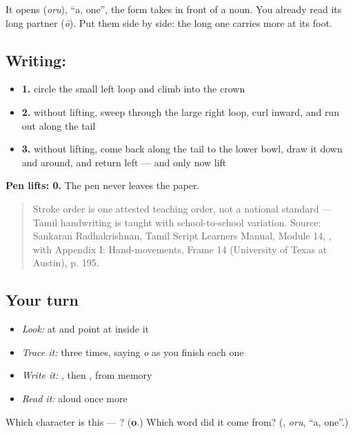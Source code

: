 It opens \textbf{} (\emph{oru}), \textquotedblleft{}a, one\textquotedblright{}, the form  takes in front of a noun. You already read its long partner \textbf{} (\emph{ō}). Put them side by side: the long one carries more at its foot.

\subsection*{Writing: }

\begin{itemize}
\raggedright
  \item \textbf{1.} circle the small left loop and climb into the crown
  \item \textbf{2.} without lifting, sweep through the large right loop, curl inward, and run out along the tail
  \item \textbf{3.} without lifting, come back along the tail to the lower bowl, draw it down and around, and return left — and only now lift
\end{itemize}

\textbf{Pen lifts: 0.} The pen never leaves the paper.

\begin{quote}
Stroke order is one attested teaching order, not a national standard — Tamil handwriting is taught with school-to-school variation. Source: Sankaran Radhakrishnan, Tamil Script Learners Manual, Module 14, , with Appendix I: Hand-movements, Frame 14 (University of Texas at Austin), p. 195.
\end{quote}

\subsection*{Your turn}
\begin{itemize}
\raggedright
  \item \emph{Look:} at \textbf{} and point at  inside it
  \item \emph{Trace it:}  three times, saying \emph{o} as you finish each one
  \item \emph{Write it:} , then , from memory
  \item \emph{Read it:} \textbf{} aloud once more
\end{itemize}

\begin{tcolorbox}[breakable,colback=teal!4,colframe=teal!35!black,title={Before you move on}]
Which character is this — ? (\textbf{o}.) Which word did it come from? (\textbf{}, \emph{oru}, \textquotedblleft{}a, one\textquotedblright{}.)
\end{tcolorbox}
